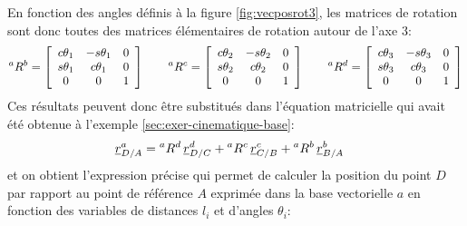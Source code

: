 %
En fonction des angles définis à la figure \ref{fig:vecposrot3}, les matrices de rotation sont donc toutes des matrices élémentaires de rotation autour de l'axe 3:
\begin{align}
{}^aR^b =
\left[ \begin{array}{c c c}
		   c\theta_1 & -s\theta_1 & 0 \\
		   s\theta_1 & c\theta_1 & 0 \\
		   0 & 0 & 1
\end{array}  \right]
\quad \quad
{}^aR^c =
\left[ \begin{array}{c c c}
		   c\theta_2 & -s\theta_2 & 0 \\
		   s\theta_2 & c\theta_2 & 0 \\
		   0 & 0 & 1
\end{array}  \right]
\quad \quad
{}^aR^d =
\left[ \begin{array}{c c c}
		   c\theta_3 & -s\theta_3 & 0 \\
		   s\theta_3 & c\theta_3 & 0 \\
		   0 & 0 & 1
\end{array}  \right]
\end{align}
Ces résultats peuvent donc être substitués dans l'équation matricielle qui avait été obtenue à l'exemple \ref{sec:exer-cinematique-base}:
\begin{align}
	\underline{r}_{D/A}^a &= {}^aR^d \, \underline{r}_{D/C}^d + {}^aR^c \, \underline{r}_{C/B}^c + {}^aR^b \, \underline{r}_{B/A}^b
	\label{eq:ex333cinematique-2}
\end{align}
et on obtient l’expression précise qui permet de calculer la position du point $D$ par rapport au point de référence $A$ exprimée dans la base vectorielle $a$ en fonction des variables de distances $l_i$ et d'angles $\theta_i$:
